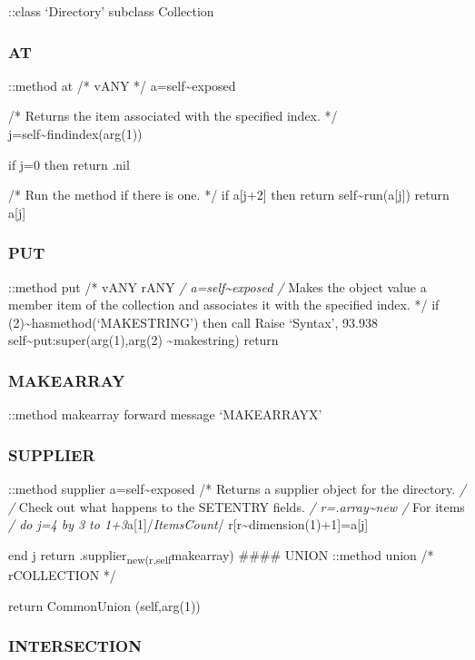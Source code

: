 ::class `Directory' subclass Collection

\subsubsection{AT}\label{at-1}

::method at /* vANY */ a=self\textasciitilde exposed

/* Returns the item associated with the specified index. */
j=self\textasciitilde findindex(arg(1))

if j=0 then return .nil

/* Run the method if there is one. */ if a{[}j+2{]} then return
self\textasciitilde run(a{[}j{]}) return a{[}j{]}

\subsubsection{PUT}\label{put-5}

::method put /* vANY rANY \emph{/ a=self\textasciitilde exposed /} Makes
the object value a member item of the collection and associates it with
the specified index. */ if
\arg(2)\textasciitilde hasmethod(`MAKESTRING') then call Raise `Syntax',
93.938 self\textasciitilde put:super(arg(1),arg(2)
\textasciitilde makestring) return

\subsubsection{MAKEARRAY}\label{makearray-2}

::method makearray forward message `MAKEARRAYX'

\subsubsection{SUPPLIER}\label{supplier-2}

::method supplier a=self\textasciitilde exposed /* Returns a supplier
object for the directory. \emph{/ /} Check out what happens to the
SETENTRY fields. \emph{/ r=.array\textasciitilde new /} For items
\emph{/ do j=4 by 3 to 1+3}a{[}1{]}/\emph{ItemsCount}/
r{[}r\textasciitilde dimension(1)+1{]}=a{[}j{]}

end j return .supplier\textsubscript{new(r,self}makearray) \#\#\#\#
UNION ::method union /* rCOLLECTION */

return CommonUnion (self,arg(1))

\subsubsection{INTERSECTION}\label{intersection-4}

